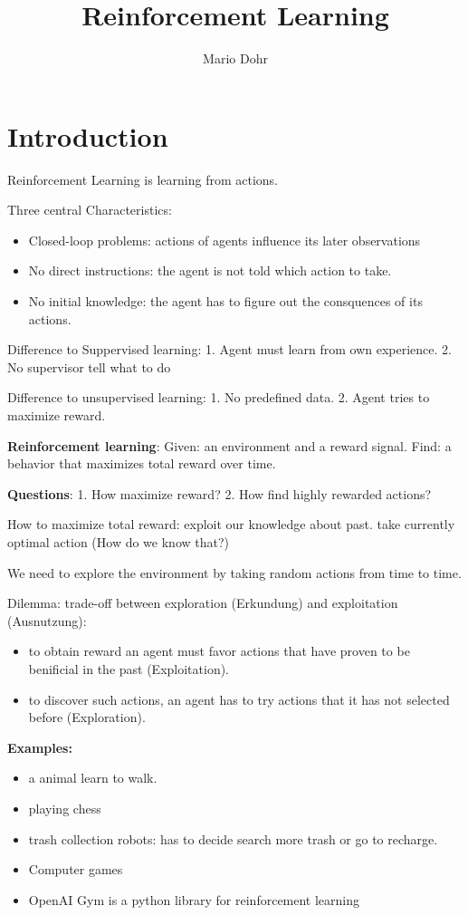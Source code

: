 \documentclass[10pt,a4paper]{article}
\author{Mario Dohr}
\title{Reinforcement Learning}
\begin{document}
\section{Introduction}
Reinforcement Learning is learning from actions.

Three central Characteristics:
\begin{itemize}
\item Closed-loop problems: actions of agents influence its later observations
\item No direct instructions: the agent is not told which action to take.
\item No initial knowledge: the agent has to figure out the consquences of its actions.
\end{itemize}

Difference to Suppervised learning: 1. Agent must learn from own experience. 2. No supervisor tell what to do

Difference to unsupervised learning: 1. No predefined data. 2. Agent tries to maximize reward.

\textbf{Reinforcement learning}: Given: an environment and a reward signal. Find: a behavior that maximizes total reward over time.

\textbf{Questions}: 1. How maximize reward? 2. How find highly rewarded actions?

How to maximize total reward: exploit our knowledge about past. take currently optimal action (How do we know that?)

We need to explore the environment by taking random actions from time to time.

Dilemma: trade-off between exploration (Erkundung) and exploitation (Ausnutzung):
\begin{itemize}
\item to obtain reward an agent must favor actions that have proven to be benificial in the past (Exploitation).
\item to discover such actions, an agent has to try actions that it has not selected before (Exploration).
\end{itemize}

\textbf{Examples:}
\begin{itemize}
\item a animal learn to walk.
\item playing chess
\item trash collection robots: has to decide search more trash or go to recharge.
\item Computer games
\item OpenAI Gym is a python library for reinforcement learning
\end{itemize}
\end{document}

